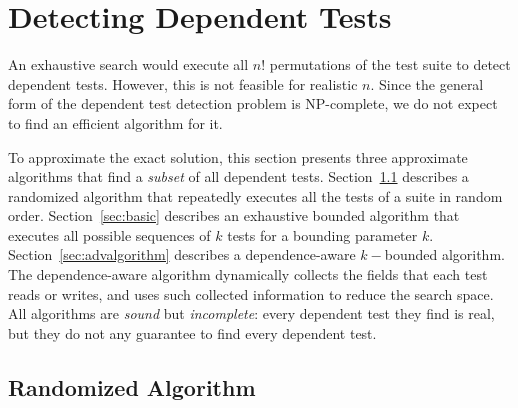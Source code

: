 \section{Detecting Dependent Tests}
\label{sec:detecting}

\newcommand{\smalltrialnum}{10\xspace}
\newcommand{\mediumtrialnum}{100\xspace}
\newcommand{\trialnum}{1000\xspace}

\newcommand{\testlist}[0]{\ensuremath{T^k_i}}
\newcommand{\executeTestsInOrder}[1]{\result{#1}{\env_0}}

An exhaustive search would execute all $n!$
permutations of the test suite to detect dependent tests.
However, this is not feasible for realistic $n$.
Since the general form of the dependent test detection problem is
NP-complete, we do not expect to find an efficient algorithm for it.

To approximate the exact solution, this section
presents three approximate algorithms that find a \textit{subset} of
all dependent tests.
Section~\ref{sec:randomized} describes a randomized algorithm
that repeatedly executes all the tests of a suite in random order.
Section~\ref{sec:basic} describes an exhaustive bounded algorithm that
executes all possible sequences of $k$ tests for a bounding parameter $k$.
Section~\ref{sec:advalgorithm} describes a dependence-aware $k-$bounded algorithm.
The dependence-aware algorithm dynamically collects the fields that each test
reads or writes, and uses such collected information to reduce the search space.
All algorithms are \textit{sound} but \textit{incomplete}:
every dependent test they find is real, but they do not
any guarantee to find every dependent test.

\subsection{Randomized Algorithm}
\label{sec:randomized}

